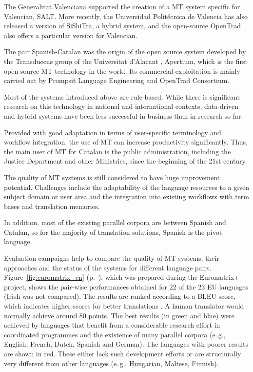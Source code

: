 \begin{multicols}{2}
The Generalitat Valenciana supported the creation of a MT system specific for Valencian, SALT. More recently, the Universidad Politécnica de Valencia has also released a version of SiShiTra, a hybrid system, and the open-source OpenTrad also offers a particular version for Valencian.

The pair Spanish-Catalan was the origin of the open source system developed by the Transducens \cite{CAT-transducens} group of the Universitat d'Alacant \cite{CAT-UnivAlacant}, Apertium, which is the first open-source MT technology in the world. Its commercial exploitation is mainly carried out by Prompsit Language Engineering and OpenTrad Consortium. 

Most of the systems introduced above are rule-based. While there is significant research on this technology in national and international contexts, data-driven and hybrid systems have been less successful in business than in research so far. 

Provided with good adaptation in terms of user-specific terminology and workflow integration, the use of MT can increase productivity significantly. Thus, the main user of MT for Catalan is the public administration, including the Justice Department and other Ministries, since the beginning of the 21st century. 

The quality of MT systems is still considered to have huge improvement potential. Challenges include the adaptability of the language resources to a given subject domain or user area and the integration into existing workflows with term bases and translation memories.

In addition, most of the existing parallel corpora are between Spanish and Catalan, so for the majority of translation solutions, Spanish is the pivot language.

Evaluation campaigns help to compare the quality of MT systems, their approaches and the status of the systems for different language pairs. Figure~\ref{fig:euromatrix_en} (p.~\pageref{fig:euromatrix_en}), which was prepared during the Euromatrix+ project, shows the pair-wise performances obtained for 22 of the 23 EU languages (Irish was not compared). The results are ranked according to a BLEU score, which indicates higher scores for better translations \cite{bleu1}. A human translator would normally achieve around 80 points. The best results (in green and blue) were achieved by languages that benefit from a considerable research effort in coordinated programmes and the existence of many parallel corpora (e.\,g., English, French, Dutch, Spanish and German). The languages with poorer results are shown in red. These either lack such development efforts or are structurally very different from other languages (e.\,g., Hungarian, Maltese, Finnish).


\end{multicols}
